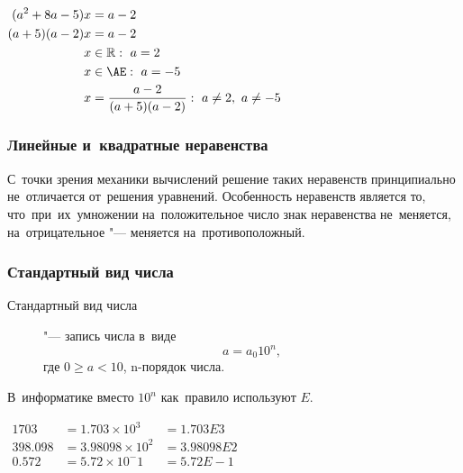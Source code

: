 \documentclass[]{scrartcl}
\begin{document}
\begin{Thexmpl}\label{ex:tasks-with-parametres-2}
	$\begin{aligned}
		(a^2+8a-5)x&=a-2\\
		(a+5)(a-2)x&=a-2\\
		x &\in \mathbb{R}:\ a=2\\
		x &\in \AE:\ a=-5\\
		x&=\frac{a-2}{(a+5)(a-2)}:\ a\neq 2,\ a\neq-5\\
	\end{aligned}$
\end{Thexmpl}
\subsubsection{Линейные и~квадратные неравенства}
С~точки зрения механики вычислений решение таких неравенств принципиально не~отличается от~решения уравнений. Особенность неравенств является то, что~при~их~умножении на~положительное число знак неравенства не~меняется, на~отрицательное "--- меняется на~противоположный.
\subsubsection{Стандартный вид числа}
\begin{description}
	\item[Стандартный вид числа] "--- запись числа в~виде
	\begin{equation}\label{eq:stand-numer}
	a=a_{0}10^{n},
	\end{equation}
где $0 \geq a < 10$, n-порядок числа.
\end{description}
В~информатике вместо $10^n$ как~правило используют $E$.
\begin{Thexmpl}\label{ex:stand}
	$\begin{aligned}
	1703 &= 1.703 \times 10^3 &= 1.703E3\\
	398.098 &= 3.98098 \times 10^2 &=3.98098E2\\
	0.572 &=5.72 \times 10^-1 &=5.72E-1\\
	\end{aligned}$
\end{Thexmpl}
\end{document}

